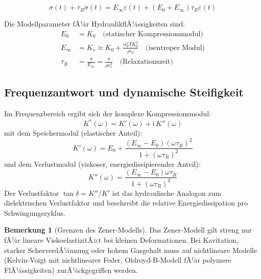 ﻿\documentclass[a4paper,12pt]{scrreprt}
\theoremstyle{definition}
\newtheorem{bemerkung}{Bemerkung}[section]
\begin{document}
\begin{equation}
  \sigma(t) + \tau_R \dot{\sigma}(t)
    = E_\infty \varepsilon(t)
    + (E_0 + E_\infty) \tau_R \dot{\varepsilon}(t)
  \label{eq:zener_hydraulik}
\end{equation}

Die Modellparameter fÃ¼r HydraulikflÃ¼ssigkeiten sind:
\begin{align}
  E_0 &= K_0 \quad \text{(statischer Kompressionsmodul)} \label{eq:e0} \\
  E_\infty &= K_s \approx K_0 + \frac{\alpha_V^2 T K_0^2}{\rho c_p}
    \quad \text{(isentroper Modul)} \label{eq:einf} \\
  \tau_R &= \frac{\eta}{E_\infty} = \frac{\eta}{\rho c_s^2}
    \quad \text{(Relaxationszeit)} \label{eq:tau_r}
\end{align}

\subsection{Frequenzantwort und dynamische Steifigkeit}

Im Frequenzbereich ergibt sich der komplexe Kompressionsmodul:
\begin{equation}
  K^*(\omega) = K'(\omega) + \mathrm{i} \, K''(\omega)
  \label{eq:kompl_modul}
\end{equation}
mit dem Speichermodul (elastischer Anteil):
\begin{equation}
  K'(\omega) = E_0 + \frac{(E_\infty - E_0) (\omega \tau_R)^2}{1 + (\omega \tau_R)^2}
  \label{eq:speichermodul}
\end{equation}
und dem Verlustmodul (viskoser, energiedissipierender Anteil):
\begin{equation}
  K''(\omega) = \frac{(E_\infty - E_0) \omega \tau_R}{1 + (\omega \tau_R)^2}
  \label{eq:verlustmodul}
\end{equation}
Der Verlustfaktor $\tan\delta = K'' / K'$ ist das hydraulische Analogon
zum dielektrischen Verlustfaktor und beschreibt die relative Energiedissipation
pro Schwingungszyklus.

\begin{bemerkung}[Grenzen des Zener-Modells]
  Das Zener-Modell gilt streng nur fÃ¼r lineare ViskoelastizitÃ¤t bei kleinen
  Deformationen. Bei Kavitation, starker ScherverdÃ¼nnung oder hohem Gasgehalt
  muss auf nichtlineare Modelle (Kelvin-Voigt mit nichtlinearer Feder,
  Oldroyd-B-Modell fÃ¼r polymere FlÃ¼ssigkeiten) zurÃ¼ckgegriffen werden.
\end{bemerkung}
\end{document}

